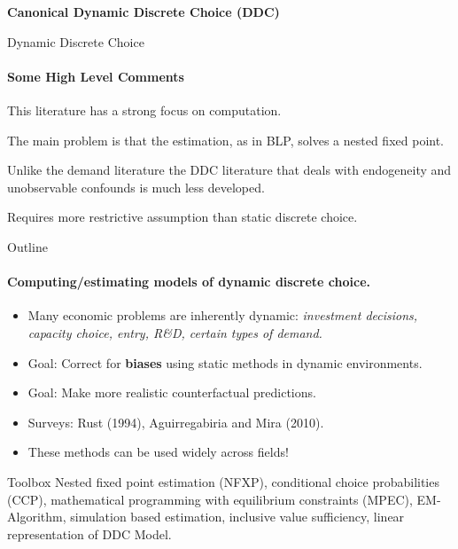 \documentclass[11pt,aspectratio=169]{beamer}
\newenvironment{l_itemize}{\itemize\addtolength{\itemsep}{+7pt}}{\enditemize}
\begin{document}


\begin{frame}[plain]
\footnotesize
\vspace{1.1cm}
\begin{center}
\huge 
\textbf{Canonical Dynamic Discrete Choice (DDC)}
\end{center}
\end{frame}

\begin{frame}{Dynamic Discrete Choice}
\framesubtitle{Some High Level Comments}

\small

\begin{l_itemize}
\item This literature has a strong focus on computation.
\item The main problem is that the estimation, as in BLP, solves a nested fixed point. 
\item Unlike the demand literature the DDC literature that deals with endogeneity and unobservable confounds is much less developed. 
\item Requires more restrictive assumption than static discrete choice. 
\end{l_itemize}
\end{frame}


\begin{frame}{Outline}
\framesubtitle{Computing/estimating models of dynamic discrete choice.} 
\small
\begin{itemize}\footnotesize
	\item Many economic problems are inherently dynamic: \textit{investment decisions, capacity choice, entry, R\&D, certain types of demand.}
	\item Goal: Correct for \textbf{biases} using static methods in dynamic environments.
	\item Goal: Make more realistic counterfactual predictions.
	\item Surveys: Rust (1994), Aguirregabiria and Mira (2010).
	\item These methods can be used widely across fields!
\end{itemize}
      \begin{block}{Toolbox}\footnotesize
        Nested fixed point estimation (NFXP), conditional choice probabilities (CCP), mathematical programming with equilibrium constraints (MPEC), EM-Algorithm, simulation based estimation, inclusive value sufficiency, linear representation of DDC Model.
      \end{block}
\end{frame}
\end{document}
